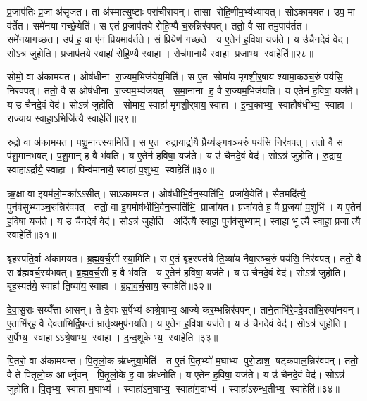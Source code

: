 प्र॒जाप॑तिः प्र॒जा अ॑सृजत। ता अ॑स्मात्सृ॒ष्टाः परा॑चीरायन्। तासा रोहि॒णीम॒भ्य॑ध्यायत्। सो॑ऽकामयत। उप॒ मा व॑र्तेत। समे॑नया गच्छे॒येति॑। स ए॒तं प्र॒जाप॑तये रोहि॒ण्यै च॒रुन्निर॑वपत्। ततो॒ वै सा तमु॒पाव॑र्तत। समे॑नयागच्छत। उप॑ ह॒ वा ए॑नं प्रि॒यमाव॑र्तते। सं प्रि॒येण॑ गच्छते। य ए॒तेन॑ ह॒विषा॒ यज॑ते। य उ॑चैनदे॒वं वेद॑। सोऽत्र॑ जुहोति। प्र॒जाप॑तये॒ स्वाहा॑ रोहि॒ण्यै स्वाहा। रोच॑मानायै॒ स्वाहा प्र॒जाभ्य॒ स्वाहेति॑॥२८॥

सोमो॒ वा अ॑कामयत। ओष॑धीना रा॒ज्यम॒भिज॑येय॒मिति॑। स ए॒त सोमा॑य मृगशी॒र्॒षाय॑ श्यामा॒कञ्च॒रुं पय॑सि॒ निर॑वपत्। ततो॒ वै स ओष॑धीना रा॒ज्यम॒भ्य॑जयत्। स॒मा॒नाना ह॒ वै रा॒ज्यम॒भिज॑यति। य ए॒तेन॑ ह॒विषा॒ यज॑ते। य उ॑ चैनदे॒वं वेद॑। सोऽत्र॑ जुहोति। सोमा॑य॒ स्वाहा॑ मृगशी॒र्‌षाय॒ स्वाहा। इ॒न्व॒काभ्य॒ स्वाहौष॑धीभ्य॒ स्वाहा। रा॒ज्याय॒ स्वाहा॒ऽभिजि॑त्यै॒ स्वाहेति॑॥२९॥

रु॒द्रो वा अ॑कामयत। प॒शु॒मान्त्स्या॒मिति॑। स ए॒त रु॒द्राया॒र्द्रायै॒ प्रैय्य॑ङ्गवञ्च॒रुं पय॑सि॒ निर॑वपत्। ततो॒ वै स प॑शु॒मान॑भवत्। प॒शु॒मान् ह॒ वै भ॑वति। य ए॒तेन॑ ह॒विषा॒ यज॑ते। य उ॑ चैनदे॒वं वेद॑। सोऽत्र॑ जुहोति। रु॒द्राय॒ स्वाहा॒ऽर्द्रायै॒ स्वाहा। पिन्व॑मानायै॒ स्वाहा॑ प॒शुभ्य॒ स्वाहेति॑॥३०॥

ऋ॒क्षा वा इ॒यम॑लो॒मका॑ऽऽसीत्। साऽका॑मयत। ओष॑धीभि॒र्वन॒स्पति॑भि॒ प्रजा॑ये॒येति॑। सैतमदि॑त्यै॒ पुन॑र्वसुभ्याञ्च॒रुन्निर॑वपत्। ततो॒ वा इ॒यमोष॑धीभि॒र्वन॒स्पति॑भि॒ प्राजा॑यत। प्रजा॑यते ह॒ वै प्र॒जया॑ प॒शुभि॑। य ए॒तेन॑ ह॒विषा॒ यज॑ते। य उ॑ चैनदे॒वं वेद॑। सोऽत्र॑ जुहोति। अदि॑त्यै॒ स्वाहा॒ पुन॑र्वसुभ्याम्। स्वाहा भूत्यै॒ स्वाहा॒ प्रजात्यै॒ स्वाहेति॑॥३१॥

बृह॒स्पति॒र्वा अ॑कामयत। ब्र॒ह्म॒व॒र्च॒सी स्या॒मिति॑। स ए॒तं बृह॒स्पत॑ये ति॒ष्या॑य नैवा॒रञ्च॒रुं पय॑सि॒ निर॑वपत्। ततो॒ वै स ब्र॑ह्मवर्च॒स्य॑भवत्। ब्र॒ह्म॒व॒र्च॒सी ह॒ वै भ॑वति। य ए॒तेन॑ ह॒विषा॒ यज॑ते। य उ॑ चैनदे॒वं वेद॑। सोऽत्र॑ जुहोति। बृह॒स्पत॑ये॒ स्वाहा॑ ति॒ष्या॑य॒ स्वाहा। ब्र॒ह्म॒व॒र्च॒साय॒ स्वाहेति॑॥३२॥

दे॒वा॒सु॒राः सय्यँ॑त्ता आसन्। ते दे॒वाः स॒र्पेभ्य॑ आश्रे॒षाभ्य॒ आज्ये॑ कर॒म्भन्निर॑वपन्। ताने॒ताभि॑रे॒वदे॒वता॑भि॒रुपा॑नयन्। ए॒ताभि॑र्‌ह॒ वै दे॒वता॑भिर्द्वि॒षन्तं॒ भ्रातृ॑व्य॒मुप॑नयति। य ए॒तेन॑ ह॒विषा॒ यज॑ते। य उ॑ चैनदे॒वं वेद॑। सोऽत्र॑ जुहोति। स॒र्पेभ्य॒ स्वाहाऽऽश्रे॒षाभ्य॒ स्वाहा। द॒न्द॒शूकेभ्य॒ स्वाहेति॑॥३३॥

पि॒तरो॒ वा अ॑कामयन्त। पि॒तृ॒लो॒क ऋ॑ध्नुया॒मेति॑। त ए॒तं पि॒तृभ्यो॑ म॒घाभ्य॑ पुरो॒डाश॒ षट्क॑पाल॒न्निर॑वपन्। ततो॒ वै ते पि॑तृलो॒क आर्ध्नुवन्। पि॒तृ॒लो॒के ह॒ वा ऋ॑ध्नोति। य ए॒तेन॑ ह॒विषा॒ यज॑ते। य उ॑ चैनदे॒वं वेद॑। सोऽत्र॑ जुहोति। पि॒तृभ्य॒ स्वाहा॑ म॒घाभ्य॑। स्वाहा॑ऽन॒घाभ्य॒ स्वाहा॑ग॒दाभ्य॑। स्वाहा॑ऽरुन्ध॒तीभ्य॒ स्वाहेति॑॥३४॥


